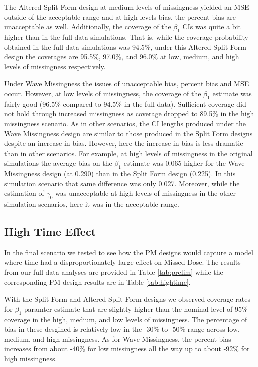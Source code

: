 \documentclass{svjour3}\usepackage[]{graphicx}\usepackage[]{color}
\begin{document}
The Altered Split Form design at medium levels of missingness yielded an MSE outside of the acceptable range and at high levels bias, the percent bias are unacceptable as well. Additionally, the coverage of the $\beta_1$ CIs was quite a bit higher than in the full-data simulations. That is, while the coverage probability obtained in the full-data simulations was 94.5\%, under this Altered Split Form design the coverages are 95.5\%, 97.0\%, and 96.0\% at low, medium, and high levels of missingness respectively. \par

Under Wave Missingness the issues of unacceptable bias, percent bias and MSE occur. However, at low levels of missingness, the coverage of the $\beta_1$ estimate was fairly good (96.5\% compared to 94.5\% in the full data). Sufficient coverage did not hold through increased missingness as coverage dropped to 89.5\% in the high missingness scenario. As in other scenarios, the CI lengths produced under the Wave Missingness design are similar to those produced in the Split Form designs despite an increase in bias. However, here the increase in bias is less dramatic than in other scenarios. For example, at high levels of missingness in the original simulations the average bias on the $\beta_1$ estimate was 0.065 higher for the Wave Missingness design (at 0.290) than in the Split Form design (0.225). In this simulation scenario that same difference was only 0.027. Moreover, while the estimation of $\gamma_0$ was unacceptable at high levels of missingness in the other simulation scenarios, here it was in the acceptable range.\par

\subsection{High Time Effect}
\label{sec:3.4}
In the final scenario we tested to see how the PM designs would capture a model where time had a disproportionately large effect on Missed Dose. The results from our full-data analyses are provided in Table \ref{tab:prelim} while the corresponding PM design results are in Table \ref{tab:hightime}. \par

With the Split Form and Altered Split Form designs we observed coverage rates for $\beta_1$ paramter estimate that are slightly higher than the nominal level of 95\% coverage in the high, medium, and low levels of missingness.  The percentage of bias in these desgined is relatively low in the -30\% to -50\% range across low, medium, and high missingness.  As for Wave Missingness, the percent bias increases from about -40\% for low missingness all the way up to about -92\% for high missingness.  \par
\end{document}
